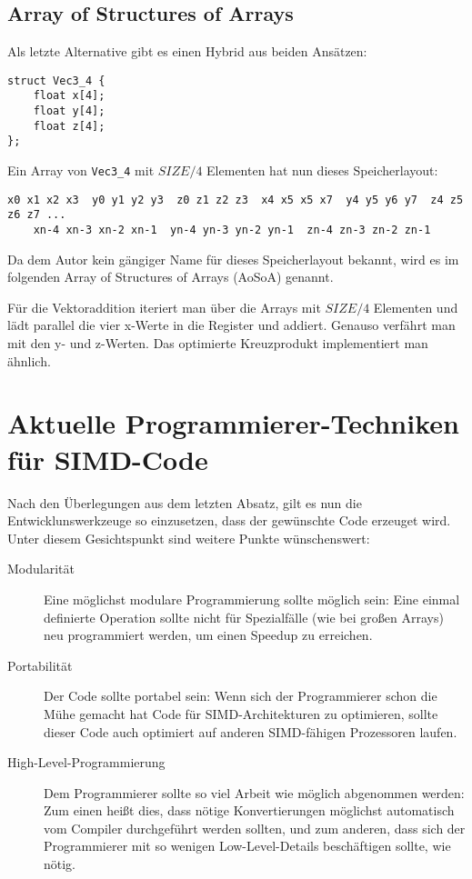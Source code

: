 \documentclass[a4paper,10pt]{article}
\begin{document}
\subsection{Array of Structures of Arrays}

Als letzte Alternative gibt es einen Hybrid aus beiden Ansätzen:

\begin{verbatim}
struct Vec3_4 {
    float x[4];
    float y[4];
    float z[4];
};
\end{verbatim}

Ein Array von \texttt{Vec3\_4} mit $SIZE/4$ Elementen hat nun dieses Speicherlayout:

\begin{verbatim}
x0 x1 x2 x3  y0 y1 y2 y3  z0 z1 z2 z3  x4 x5 x5 x7  y4 y5 y6 y7  z4 z5 z6 z7 ... 
    xn-4 xn-3 xn-2 xn-1  yn-4 yn-3 yn-2 yn-1  zn-4 zn-3 zn-2 zn-1
\end{verbatim}

Da dem Autor kein gängiger Name für dieses Speicherlayout bekannt, wird es im folgenden Array of
Structures of Arrays (AoSoA) genannt.

Für die Vektoraddition iteriert man über die Arrays mit $SIZE/4$ Elementen und lädt parallel 
die vier x-Werte in die Register und addiert. Genauso verfährt man mit den y- und z-Werten.
Das optimierte Kreuzprodukt implementiert man ähnlich.

\newpage
\section{Aktuelle Programmierer-Techniken für SIMD-Code}

Nach den Überlegungen aus dem letzten Absatz, gilt es nun die Entwicklunswerkzeuge so einzusetzen,
dass der gewünschte Code erzeuget wird. Unter diesem Gesichtspunkt sind weitere Punkte
wünschenswert:

\begin{description}
    \item[Modularität] Eine möglichst modulare Programmierung sollte möglich sein: Eine einmal definierte
    Operation sollte nicht für Spezialfälle (wie bei großen Arrays) neu programmiert werden, um
    einen Speedup zu erreichen.

    \item[Portabilität] Der Code sollte portabel sein: Wenn sich der Programmierer schon die Mühe gemacht hat Code
    für SIMD-Architekturen zu optimieren, sollte dieser Code auch optimiert auf anderen SIMD-fähigen
    Prozessoren laufen.

    \item[High-Level-Programmierung] Dem Programmierer sollte so viel Arbeit wie möglich abgenommen werden: Zum einen heißt
    dies, dass nötige Konvertierungen möglichst automatisch vom Compiler durchgeführt werden
    sollten, und zum anderen, dass sich der Programmierer mit so wenigen Low-Level-Details
    beschäftigen sollte, wie nötig.

\end{description}
\end{document}
